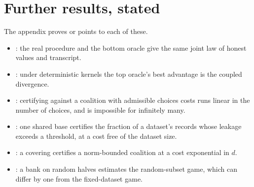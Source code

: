 \section{Further results, stated}
The appendix proves or points to each of these.
\begin{itemize}[nosep]
\item {}: the real procedure and the bottom oracle
  give the same joint law of honest values and transcript.
\item {}: under deterministic kernels the top oracle's
  best advantage is the coupled divergence.
\item {}: certifying against a coalition with
  admissible choices costs runs linear in the number of choices, and is
  impossible for infinitely many.
\item {}: one shared base certifies the fraction
  of a dataset's records whose leakage exceeds a threshold, at a cost free of the
  dataset size.
\item {}: a covering certifies a norm-bounded
  coalition at a cost exponential in $d$.
\item {}: a bank on random halves estimates the random-subset
  game, which can differ by one from the fixed-dataset game.
\end{itemize}
